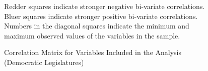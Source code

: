 \documentclass[a4paper]{article}\usepackage[]{graphicx}\usepackage[]{color}
\begin{document}
\begin{landscape}
\begin{figure}[t]
    \caption{Correlation Matrix for Variables Included in the Analysis (Democratic Legislatures)}
    \label{corrmatrix}

    \begin{singlespace}
        {\scriptsize{Redder squares indicate stronger negative bi-variate correlations. \\
        Bluer squares indicate stronger positive bi-variate correlations. \\
        Numbers in the diagonal squares indicate the minimum and maximum observed values of the variables in the sample.
        }}
    \end{singlespace}
\end{figure}
\end{landscape}




\end{document}
